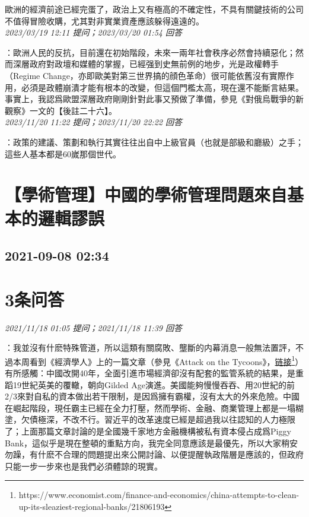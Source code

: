 \documentclass[twocolumn]{ctexart}
\begin{document}
歐洲的經濟前途已經完蛋了，政治上又有極高的不確定性，不具有關鍵技術的公司不值得冒險收購，尤其對非實業資產應該躲得遠遠的。
\\

\textit{\hfill\noindent\small 2023/03/19 12:11 提问；2023/03/20 01:54 回答}

：歐洲人民的反抗，目前還在初始階段，未來一兩年社會秩序必然會持續惡化；然而深層政府對政壇和媒體的掌握，已經强到史無前例的地步，光是政權轉手（Regime Change，亦即歐美對第三世界搞的顔色革命）很可能依舊沒有實際作用，必須是政體崩潰才能有根本的改變，但這個門檻太高，現在還不能斷言結果。事實上，我認爲歐盟深層政府剛剛針對此事又預做了準備，參見《對俄烏戰爭的新觀察》一文的【後註二十六】。
\\

\textit{\hfill\noindent\small 2023/11/20 11:22 提问；2023/11/20 22:22 回答}

：政策的建議、策劃和執行其實往往出自中上級官員（也就是部級和廳級）之手；這些人基本都是60嵗那個世代。
\\


\section{【學術管理】中國的學術管理問題來自基本的邏輯謬誤}
\subsection{2021-09-08 02:34}


\section{3条问答}

\textit{\hfill\noindent\small 2021/11/18 01:05 提问；2021/11/18 11:39 回答}

：我並沒有什麽特殊管道，所以這類有關腐敗、壟斷的内幕消息一般無法置評，不過本周看到《經濟學人》上的一篇文章（參見《Attack on the Tycoons》，\href{https://www.economist.com/finance-and-economics/china-attempts-to-clean-up-its-sleaziest-regional-banks/21806193}{链接\footnote{\url{https://www.economist.com/finance-and-economics/china-attempts-to-clean-up-its-sleaziest-regional-banks/21806193}}}）有所感觸：中國改開40年，全面引進市場經濟卻沒有配套的監管系統的結果，是重蹈19世紀英美的覆轍，朝向Gilded Age演進。美國能夠慢慢吞吞、用20世紀的前2/3來對自私的資本做出若干限制，是因爲擁有霸權，沒有太大的外來危險。中國在崛起階段，現任霸主已經在全力打壓，然而學術、金融、商業管理上都是一塌糊塗，欠債極深，不改不行。習近平的改革速度已經是超過我以往認知的人力極限了；上面那篇文章討論的是全國幾千家地方金融機構被私有資本侵占成爲Piggy Bank，這似乎是現在整頓的重點方向，我完全同意應該是最優先，所以大家稍安勿躁，有什麽不合理的問題提出來公開討論、以便提醒執政階層是應該的，但政府只能一步一步來也是我們必須體諒的現實。
\\
\end{document}
